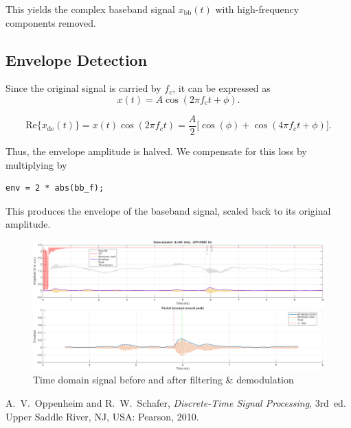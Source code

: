 \documentclass[10pt]{article}
\begin{document}
This yields the complex baseband signal $x_{\mathrm{bb}}(t)$ with high-frequency components removed.

\subsection*{Envelope Detection}

Since the original signal is carried by $f_c$, it can be expressed as
\[
x(t) = A \cos(2\pi f_c t + \phi).
\]

\[
\mathrm{Re}\{x_{\mathrm{de}}(t)\} = x(t)\cos(2\pi f_c t)
= \frac{A}{2} \bigl[\cos(\phi) + \cos(4 \pi f_c t + \phi)\bigr].
\]

Thus, the envelope amplitude is halved. We compensate for this loss by multiplying by 

\begin{lstlisting}
env = 2 * abs(bb_f);
\end{lstlisting}

This produces the envelope of the baseband signal, scaled back to its original amplitude.

\begin{figure}[!h]
	\centering 
		\includegraphics[width = .99\columnwidth]{fig/100_tdomain_raw_processed}	
	\caption{Time domain signal before and after filtering \& demodulation}
\label{fig:tdom_raw and processed}
\end{figure}




\pagebreak

\begin{thebibliography}{99}

A.~V.~Oppenheim and R.~W.~Schafer,
\textit{Discrete-Time Signal Processing}, 3rd~ed.
Upper Saddle River, NJ, USA: Pearson, 2010.

\end{thebibliography}
\end{document}
